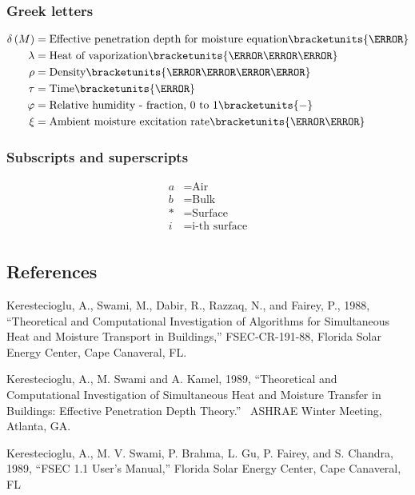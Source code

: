 \subsubsection{Greek letters}\label{greek-letters}
\begin{align*}  
  \delta\PB{M}  &= \text{Effective penetration depth for moisture equation} \bracketunits{\meter} \\
  \lambda       &= \text{Heat of vaporization} \bracketunits{\joule\per\kilogram} \\
  \rho          &= \text{Density} \bracketunits{\kilogram\per\cubic\meter} \\
  \tau          &= \text{Time} \bracketunits{\second} \\
  \varphi       &= \text{Relative humidity - fraction, 0 to 1} \bracketunits{-} \\
  \xi           &= \text{Ambient moisture excitation rate} \bracketunits{\per\hour}
\end{align*}

\subsubsection{Subscripts and superscripts}\label{subscripts-and-superscripts}
\begin{align*}  
  a             &= \text{Air} \\
  b             &= \text{Bulk} \\
  *             &= \text{Surface} \\
  i             &= \text{i-th surface} \\
\end{align*}

\subsection{References}\label{references-019}

Kerestecioglu, A., Swami, M., Dabir, R., Razzaq, N., and Fairey, P., 1988, ``Theoretical and Computational Investigation of Algorithms for Simultaneous Heat and Moisture Transport in Buildings,'' FSEC-CR-191-88, Florida Solar Energy Center, Cape Canaveral, FL.

Kerestecioglu, A., M. Swami and A. Kamel, 1989, ``Theoretical and Computational Investigation of Simultaneous Heat and Moisture Transfer in Buildings: Effective Penetration Depth Theory.''~ ASHRAE Winter Meeting, Atlanta, GA.

Kerestecioglu, A., M. V. Swami, P. Brahma, L. Gu, P. Fairey, and S. Chandra, 1989, ``FSEC 1.1 User's Manual,'' Florida Solar Energy Center, Cape Canaveral, FL

